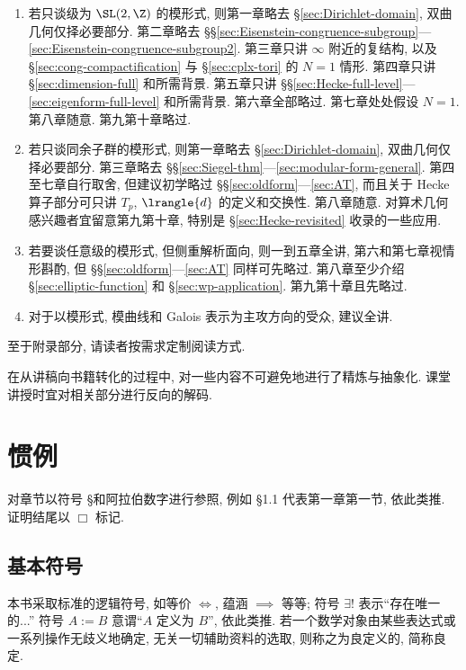 \begin{enumerate}
	\item 若只谈级为 $\SL(2, \Z)$ 的模形式, 则第一章略去 \S\ref{sec:Dirichlet-domain}, 双曲几何仅择必要部分. 第二章略去 \S\S\ref{sec:Eisenstein-congruence-subgroup}---\ref{sec:Eisenstein-congruence-subgroup2}. 第三章只讲 $\infty$ 附近的复结构, 以及 \S\ref{sec:cong-compactification} 与 \S\ref{sec:cplx-tori} 的 $N=1$ 情形. 第四章只讲 \S\ref{sec:dimension-full} 和所需背景. 第五章只讲 \S\S\ref{sec:Hecke-full-level}---\ref{sec:eigenform-full-level} 和所需背景. 第六章全部略过. 第七章处处假设 $N=1$. 第八章随意. 第九第十章略过.
	
	\item 若只谈同余子群的模形式, 则第一章略去 \S\ref{sec:Dirichlet-domain}, 双曲几何仅择必要部分. 第三章略去 \S\S\ref{sec:Siegel-thm}---\ref{sec:modular-form-general}. 第四至七章自行取舍, 但建议初学略过 \S\S\ref{sec:oldform}---\ref{sec:AT}, 而且关于 Hecke 算子部分可只讲 $T_p$, $\lrangle{d}$ 的定义和交换性. 第八章随意. 对算术几何感兴趣者宜留意第九第十章, 特别是 \S\ref{sec:Hecke-revisited} 收录的一些应用.
	
	\item 若要谈任意级的模形式, 但侧重解析面向, 则一到五章全讲, 第六和第七章视情形斟酌, 但 \S\S\ref{sec:oldform}---\ref{sec:AT} 同样可先略过. 第八章至少介绍 \S\ref{sec:elliptic-function} 和 \S\ref{sec:wp-application}. 第九第十章且先略过.
	
	\item 对于以模形式, 模曲线和 Galois 表示为主攻方向的受众, 建议全讲.
\end{enumerate}

至于附录部分, 请读者按需求定制阅读方式.

在从讲稿向书籍转化的过程中, 对一些内容不可避免地进行了精炼与抽象化. 课堂讲授时宜对相关部分进行反向的解码.

\section*{惯例}
对章节以符号 \S 和阿拉伯数字进行参照, 例如 \S 1.1 代表第一章第一节, 依此类推. 证明结尾以 $\Box$ 标记.

\subsection*{基本符号}
本书采取标准的逻辑符号, 如等价 $\iff$, 蕴涵 $\implies$ 等等; 符号 $\exists!$ 表示``存在唯一的...'' 符号 $A := B$ 意谓``$A$ 定义为 $B$'', 依此类推. 若一个数学对象由某些表达式或一系列操作无歧义地确定, 无关一切辅助资料的选取, 则称之为良定义的, 简称良定.

